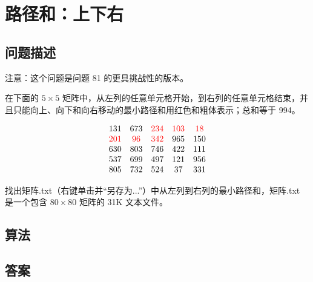 \section{路径和：上下右}\label{sec:problem82}
\subsection{问题描述}
\begin{tcolorbox}

	注意：这个问题是问题 81 的更具挑战性的版本。

	在下面的 $5 \times 5$ 矩阵中，从左列的任意单元格开始，到右列的任意单元格结束，并且只能向上、向下和向右移动的最小路径和用红色和粗体表示；总和等于 994。

	\[
		\begin{array}{ccccc}
			131       & 673      & \textcolor{red}{234} & \textcolor{red}{103} & \textcolor{red}{18} \\
			\textcolor{red}{201} & \textcolor{red}{96} & \textcolor{red}{342} & 965       & 150      \\
			630       & 803      & 746       & 422       & 111      \\
			537       & 699      & 497       & 121       & 956      \\
			805       & 732      & 524       & 37        & 331      \\
		\end{array}
	\]

	找出矩阵.txt（右键单击并“另存为...”）中从左列到右列的最小路径和，矩阵.txt 是一个包含 $80 \times 80$ 矩阵的 31K 文本文件。
\end{tcolorbox}

\subsection{算法}

\subsection{答案}
